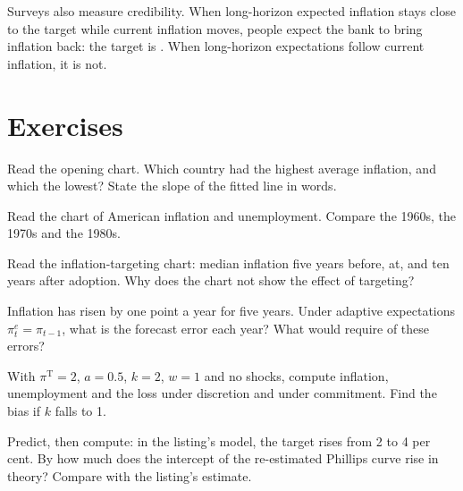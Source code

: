 Surveys also measure credibility. When long-horizon expected inflation stays close to the target while current inflation
moves, people expect the bank to bring inflation back: the target is . When long-horizon expectations follow
current inflation, it is not.

\section{Exercises}\label{sec:b2:expectations-and-lucas-critique:exercises}

\begin{exercise}[$\star$]\label{exo:b2:expectations-and-lucas-critique:1}
Read the opening chart. Which country had the highest average inflation, and which the lowest? State the slope of the
fitted line in words.
\end{exercise}

\begin{exercise}[$\star$]\label{exo:b2:expectations-and-lucas-critique:2}
Read the chart of American inflation and unemployment. Compare the 1960s, the 1970s and the 1980s.
\end{exercise}

\begin{exercise}[$\star$]\label{exo:b2:expectations-and-lucas-critique:3}
Read the inflation-targeting chart: median inflation five years before, at, and ten years after adoption. Why does the
chart not show the effect of targeting?
\end{exercise}

\begin{exercise}[$\star$]\label{exo:b2:expectations-and-lucas-critique:4}
Inflation has risen by one point a year for five years. Under adaptive expectations $\pi^e_t = \pi_{t-1}$, what is the forecast error each year? What
would  require of these errors?
\end{exercise}

\begin{exercise}[$\star\star$]\label{exo:b2:expectations-and-lucas-critique:5}
With $\pi^{\mathrm T} = 2$, $a = 0.5$, $k = 2$, $w = 1$ and no shocks, compute inflation, unemployment and the loss under discretion and under commitment. Find the bias if
$k$ falls to 1.
\end{exercise}

\begin{exercise}[$\star\star$]\label{exo:b2:expectations-and-lucas-critique:6}
Predict, then compute: in the listing's model, the target rises from 2 to 4 per cent. By how much does the intercept of the
re-estimated Phillips curve rise in theory? Compare with the listing's estimate.
\end{exercise}

